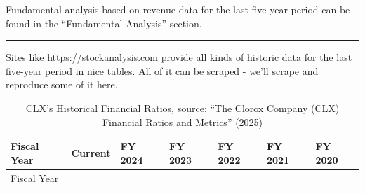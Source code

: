 \documentclass[
  letterpaper,
  DIV=11,
  numbers=noendperiod]{scrartcl}
\begin{document}
Fundamental analysis based on revenue data for the last five-year period
can be found in the ``Fundamental Analysis'' section.

\begin{center}\rule{0.5\linewidth}{0.5pt}\end{center}

Sites like \url{https://stockanalysis.com} provide all kinds of historic
data for the last five-year period in nice tables. All of it can be
scraped - we'll scrape and reproduce some of it here.

\begin{longtable}[]{@{}
  >{\raggedright\arraybackslash}p{}
  >{\raggedright\arraybackslash}p{}
  >{\raggedright\arraybackslash}p{}
  >{\raggedright\arraybackslash}p{}
  >{\raggedright\arraybackslash}p{}
  >{\raggedright\arraybackslash}p{}
  >{\raggedright\arraybackslash}p{}@{}}
\caption{CLX's Historical Financial Ratios, source: {``The {Clorox
Company} ({CLX}) {Financial Ratios} and {Metrics}''}
(2025)}\tabularnewline
\toprule\noalign{}
\begin{minipage}[b]{\linewidth}\raggedright
Fiscal Year
\end{minipage} & \begin{minipage}[b]{\linewidth}\raggedright
Current
\end{minipage} & \begin{minipage}[b]{\linewidth}\raggedright
FY 2024
\end{minipage} & \begin{minipage}[b]{\linewidth}\raggedright
FY 2023
\end{minipage} & \begin{minipage}[b]{\linewidth}\raggedright
FY 2022
\end{minipage} & \begin{minipage}[b]{\linewidth}\raggedright
FY 2021
\end{minipage} & \begin{minipage}[b]{\linewidth}\raggedright
FY 2020
\end{minipage} \\
\midrule\noalign{}
\endfirsthead
\toprule\noalign{}
\begin{minipage}[b]{\linewidth}\raggedright
Fiscal Year
\end{minipage} & \begin{minipage}[b]{\linewidth}\raggedright

\end{minipage}
\end{longtable}
\end{document}
